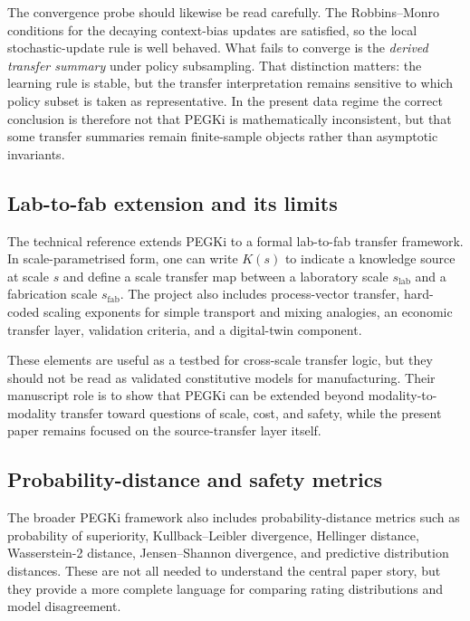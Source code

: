 \documentclass[twoside,twocolumn,9pt]{article}
\begin{document}
The convergence probe should likewise be read carefully. The Robbins--Monro conditions for the decaying context-bias updates are satisfied, so the local stochastic-update rule is well behaved. What fails to converge is the \emph{derived transfer summary} under policy subsampling. That distinction matters: the learning rule is stable, but the transfer interpretation remains sensitive to which policy subset is taken as representative. In the present data regime the correct conclusion is therefore not that PEGKi is mathematically inconsistent, but that some transfer summaries remain finite-sample objects rather than asymptotic invariants.

\subsection{Lab-to-fab extension and its limits}

The technical reference extends PEGKi to a formal lab-to-fab transfer framework. In scale-parametrised form, one can write $K(s)$ to indicate a knowledge source at scale $s$ and define a scale transfer map between a laboratory scale $s_{\mathrm{lab}}$ and a fabrication scale $s_{\mathrm{fab}}$. The project also includes process-vector transfer, hard-coded scaling exponents for simple transport and mixing analogies, an economic transfer layer, validation criteria, and a digital-twin component.

These elements are useful as a testbed for cross-scale transfer logic, but they should not be read as validated constitutive models for manufacturing. Their manuscript role is to show that PEGKi can be extended beyond modality-to-modality transfer toward questions of scale, cost, and safety, while the present paper remains focused on the source-transfer layer itself.

\subsection{Probability-distance and safety metrics}

The broader PEGKi framework also includes probability-distance metrics such as probability of superiority, Kullback--Leibler divergence, Hellinger distance, Wasserstein-2 distance, Jensen--Shannon divergence, and predictive distribution distances.\cite{GibbsSu2002Metrics,SzekelyRizzo2013EnergyDistance,Villani2008OptimalTransport} These are not all needed to understand the central paper story, but they provide a more complete language for comparing rating distributions and model disagreement.
\end{document}
